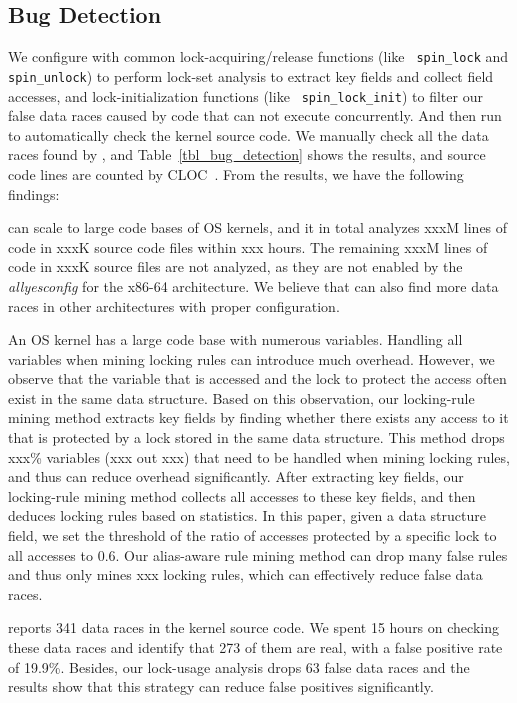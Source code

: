 \subsection{Bug Detection}
\label{subsec_bug_detection}

We configure \sys with common lock-acquiring/release functions (like {\tt 
spin\_lock} and {\tt spin\_unlock}) to perform lock-set analysis to extract key 
fields and collect field accesses, and lock-initialization functions (like {\tt 
spin\_lock\_init}) to filter our false data races caused by code that can not 
execute concurrently. And then run \sys to automatically check the kernel 
source code. We manually check all the data races found by \sys, and 
Table~\ref{tbl_bug_detection} shows the results, and source code lines are 
counted by CLOC~\cite{cloc}. From the results, we have the following findings:

 \sys can scale to large code bases of OS kernels, and it in 
total analyzes xxxM lines of code in xxxK source code files within xxx hours. 
The remaining xxxM lines of code in xxxK source files are not analyzed, as they 
are not enabled by the {\em allyesconfig} for the x86-64 architecture. We 
believe that \sys can also find more data races in other architectures with 
proper configuration.

 An OS kernel has a large code base with numerous 
variables. Handling all variables when mining locking rules can introduce much 
overhead. However, we observe that the variable that is accessed and the lock 
to protect the access often exist in the same data structure. Based on this 
observation, our locking-rule mining method extracts key fields by finding 
whether there exists any access to it that is protected by a lock stored in the 
same data structure. This method drops xxx\% variables (xxx out xxx) that need 
to be handled when mining locking rules, and thus can reduce overhead 
significantly. After extracting key fields, our locking-rule mining method 
collects all accesses to these key fields, and then deduces locking rules based 
on statistics. In this paper, given a data structure field, we set the 
threshold of the ratio of accesses protected by a specific lock to all accesses 
to 0.6. Our alias-aware rule mining method can drop many false rules and thus 
only mines xxx locking rules, which can effectively reduce false data races.

 \sys reports 341 data races in the kernel source 
code. We spent 15 hours on checking these data races and identify that 273 of 
them are real, with a false positive rate of 19.9\%. Besides, our lock-usage 
analysis drops 63 false data races and the results show that this strategy can 
reduce false positives significantly.

